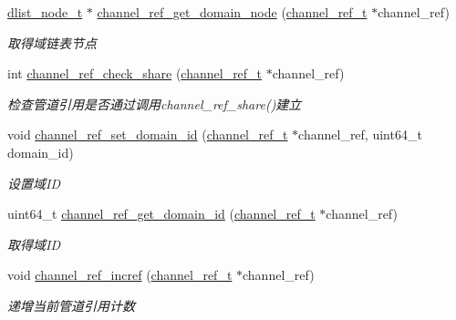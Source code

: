 \begin{DoxyCompactItemize}
\hyperlink{a00044_a62053232bcf3566010ef98a7d77c3cc8_a62053232bcf3566010ef98a7d77c3cc8}{dlist\+\_\+node\+\_\+t} $\ast$ \hyperlink{a00041_ab5e94cb95124a4c5db7ddf5750a9bb17_ab5e94cb95124a4c5db7ddf5750a9bb17}{channel\+\_\+ref\+\_\+get\+\_\+domain\+\_\+node} (\hyperlink{a00044_a151271c9d188ef28d4d24bb81dcc1263_a151271c9d188ef28d4d24bb81dcc1263}{channel\+\_\+ref\+\_\+t} $\ast$channel\+\_\+ref)
\begin{DoxyCompactList}\small\item\em 取得域链表节点 \end{DoxyCompactList}\item 
int \hyperlink{a00041_ab71c6ed6109fedf4cf941b8de498a622_ab71c6ed6109fedf4cf941b8de498a622}{channel\+\_\+ref\+\_\+check\+\_\+share} (\hyperlink{a00044_a151271c9d188ef28d4d24bb81dcc1263_a151271c9d188ef28d4d24bb81dcc1263}{channel\+\_\+ref\+\_\+t} $\ast$channel\+\_\+ref)
\begin{DoxyCompactList}\small\item\em 检查管道引用是否通过调用channel\+\_\+ref\+\_\+share()建立 \end{DoxyCompactList}\item 
void \hyperlink{a00041_a66387736035e1c761a9ceebf3c33d9cf_a66387736035e1c761a9ceebf3c33d9cf}{channel\+\_\+ref\+\_\+set\+\_\+domain\+\_\+id} (\hyperlink{a00044_a151271c9d188ef28d4d24bb81dcc1263_a151271c9d188ef28d4d24bb81dcc1263}{channel\+\_\+ref\+\_\+t} $\ast$channel\+\_\+ref, uint64\+\_\+t domain\+\_\+id)
\begin{DoxyCompactList}\small\item\em 设置域\+I\+D \end{DoxyCompactList}\item 
uint64\+\_\+t \hyperlink{a00041_a8498a205a4580c25c337a33b571396f7_a8498a205a4580c25c337a33b571396f7}{channel\+\_\+ref\+\_\+get\+\_\+domain\+\_\+id} (\hyperlink{a00044_a151271c9d188ef28d4d24bb81dcc1263_a151271c9d188ef28d4d24bb81dcc1263}{channel\+\_\+ref\+\_\+t} $\ast$channel\+\_\+ref)
\begin{DoxyCompactList}\small\item\em 取得域\+I\+D \end{DoxyCompactList}\item 
void \hyperlink{a00041_aef059f673946f97e8b892b600f839af1_aef059f673946f97e8b892b600f839af1}{channel\+\_\+ref\+\_\+incref} (\hyperlink{a00044_a151271c9d188ef28d4d24bb81dcc1263_a151271c9d188ef28d4d24bb81dcc1263}{channel\+\_\+ref\+\_\+t} $\ast$channel\+\_\+ref)
\begin{DoxyCompactList}\small\item\em 递增当前管道引用计数 \end{DoxyCompactList}\item 

\end{DoxyCompactItemize}
